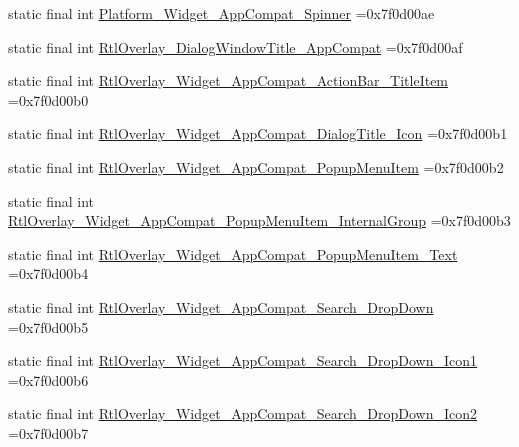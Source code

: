 \begin{DoxyCompactItemize}
static final int \mbox{\hyperlink{classcom_1_1example_1_1trainawearapplication_1_1_r_1_1style_a4c2bdf343c31918a820d825a310a8a98}{Platform\+\_\+\+Widget\+\_\+\+App\+Compat\+\_\+\+Spinner}} =0x7f0d00ae
\item 
static final int \mbox{\hyperlink{classcom_1_1example_1_1trainawearapplication_1_1_r_1_1style_aca6730a82e918465fb444f2a22ac725d}{Rtl\+Overlay\+\_\+\+Dialog\+Window\+Title\+\_\+\+App\+Compat}} =0x7f0d00af
\item 
static final int \mbox{\hyperlink{classcom_1_1example_1_1trainawearapplication_1_1_r_1_1style_ae90e867003364a32b6ec517c4474219c}{Rtl\+Overlay\+\_\+\+Widget\+\_\+\+App\+Compat\+\_\+\+Action\+Bar\+\_\+\+Title\+Item}} =0x7f0d00b0
\item 
static final int \mbox{\hyperlink{classcom_1_1example_1_1trainawearapplication_1_1_r_1_1style_abfa7f1b56c9e2b4528051b4c44a7c005}{Rtl\+Overlay\+\_\+\+Widget\+\_\+\+App\+Compat\+\_\+\+Dialog\+Title\+\_\+\+Icon}} =0x7f0d00b1
\item 
static final int \mbox{\hyperlink{classcom_1_1example_1_1trainawearapplication_1_1_r_1_1style_a0224286f97137c21b9cb231019b3f4ec}{Rtl\+Overlay\+\_\+\+Widget\+\_\+\+App\+Compat\+\_\+\+Popup\+Menu\+Item}} =0x7f0d00b2
\item 
static final int \mbox{\hyperlink{classcom_1_1example_1_1trainawearapplication_1_1_r_1_1style_acf89c4600f624a7949e17bb7971caa0c}{Rtl\+Overlay\+\_\+\+Widget\+\_\+\+App\+Compat\+\_\+\+Popup\+Menu\+Item\+\_\+\+Internal\+Group}} =0x7f0d00b3
\item 
static final int \mbox{\hyperlink{classcom_1_1example_1_1trainawearapplication_1_1_r_1_1style_afdbd740d251e20e1b77eb0f012d49534}{Rtl\+Overlay\+\_\+\+Widget\+\_\+\+App\+Compat\+\_\+\+Popup\+Menu\+Item\+\_\+\+Text}} =0x7f0d00b4
\item 
static final int \mbox{\hyperlink{classcom_1_1example_1_1trainawearapplication_1_1_r_1_1style_a196fea3e77a82af1e13add5b042399cf}{Rtl\+Overlay\+\_\+\+Widget\+\_\+\+App\+Compat\+\_\+\+Search\+\_\+\+Drop\+Down}} =0x7f0d00b5
\item 
static final int \mbox{\hyperlink{classcom_1_1example_1_1trainawearapplication_1_1_r_1_1style_ae0e8a0cf011f7c9b4309ae571f3f4d27}{Rtl\+Overlay\+\_\+\+Widget\+\_\+\+App\+Compat\+\_\+\+Search\+\_\+\+Drop\+Down\+\_\+\+Icon1}} =0x7f0d00b6
\item 
static final int \mbox{\hyperlink{classcom_1_1example_1_1trainawearapplication_1_1_r_1_1style_a73d454cdc62cb135cefd1e610d78503c}{Rtl\+Overlay\+\_\+\+Widget\+\_\+\+App\+Compat\+\_\+\+Search\+\_\+\+Drop\+Down\+\_\+\+Icon2}} =0x7f0d00b7

\end{DoxyCompactItemize}
